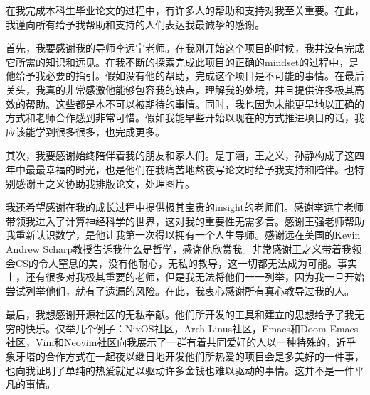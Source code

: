 \documentclass[bachelor, comfort]{shtthesis}
\begin{document}
\begin{acknowledgement}
	在我完成本科生毕业论文的过程中，有许多人的帮助和支持对我至关重要。在此，我谨向所有给予我帮助和支持的人们表达我最诚挚的感谢。

	首先，我要感谢我的导师李远宁老师。在我刚开始这个项目的时候，我并没有完成它所需的知识和远见。在我不断的探索完成此项目的正确的mindset的过程中，是他给予我必要的指引。假如没有他的帮助，完成这个项目是不可能的事情。在最后关头，我真的非常感激他能够包容我的缺点，理解我的处境，并且提供许多极其高效的帮助。这些都是本不可以被期待的事情。同时，我也因为未能更早地以正确的方式和老师合作感到非常可惜。假如我能早些开始以现在的方式推进项目的话，我应该能学到很多很多，也完成更多。

	其次，我要感谢始终陪伴着我的朋友和家人们。是丁涵，王之义，孙静构成了这四年中最最幸福的时光，也是他们在我痛苦地熬夜写论文时给予我支持和陪伴。也特别感谢王之义协助我排版论文，处理图片。

	我还希望感谢在我的成长过程中提供极其宝贵的insight的老师们。感谢李远宁老师带领我进入了计算神经科学的世界，这对我的重要性无需多言。感谢王强老师帮助我重新认识数学，是他让我第一次得以拥有一个人生导师。感谢远在美国的Kevin Andrew Scharp教授告诉我什么是哲学，感谢他欣赏我。非常感谢王之义带着我领会CS的令人窒息的美，没有他耐心，无私的教导，这一切都无法成为可能。事实上，还有很多对我极其重要的老师，但是我无法将他们一一列举，因为我一旦开始尝试列举他们，就有了遗漏的风险。在此，我衷心感谢所有真心教导过我的人。

	最后，我想感谢开源社区的无私奉献。他们所开发的工具和建立的思想给予了我无穷的快乐。仅举几个例子：NixOS社区，Arch Linus社区，Emacs和Doom Emacs社区，Vim和Neovim社区向我展示了一群有着共同爱好的人以一种特殊的，近乎象牙塔的合作方式在一起夜以继日地开发他们所热爱的项目会是多美好的一件事，也向我证明了单纯的热爱就足以驱动许多金钱也难以驱动的事情。这并不是一件平凡的事情。

\end{acknowledgement}
\end{document}
